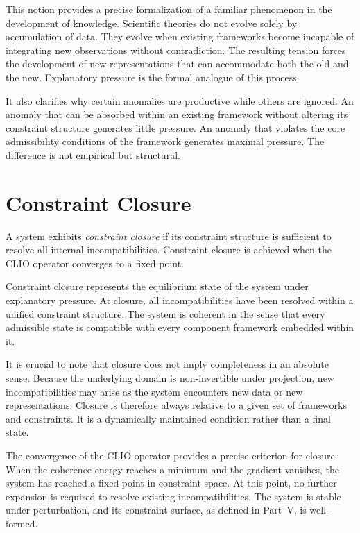 \documentclass[11pt,openany]{book}
\begin{document}
This notion provides a precise formalization of a familiar
phenomenon in the development of knowledge. Scientific
theories do not evolve solely by accumulation of data.
They evolve when existing frameworks become incapable of
integrating new observations without contradiction. The
resulting tension forces the development of new
representations that can accommodate both the old and the
new. Explanatory pressure is the formal analogue of this
process.

It also clarifies why certain anomalies are productive
while others are ignored. An anomaly that can be absorbed
within an existing framework without altering its
constraint structure generates little pressure. An anomaly
that violates the core admissibility conditions of the
framework generates maximal pressure. The difference is not
empirical but structural.

\section{Constraint Closure}
\label{sec:closure}

\begin{definition}
\label{def:closure}
A system exhibits \emph{constraint closure} if its
constraint structure is sufficient to resolve all internal
incompatibilities. Constraint closure is achieved when the
CLIO operator converges to a fixed point.
\end{definition}

Constraint closure represents the equilibrium state of the
system under explanatory pressure. At closure, all
incompatibilities have been resolved within a unified
constraint structure. The system is coherent in the sense
that every admissible state is compatible with every
component framework embedded within it.

It is crucial to note that closure does not imply
completeness in an absolute sense. Because the underlying
domain is non-invertible under projection, new
incompatibilities may arise as the system encounters new
data or new representations. Closure is therefore always
relative to a given set of frameworks and constraints. It
is a dynamically maintained condition rather than a final
state.

The convergence of the CLIO operator provides a precise
criterion for closure. When the coherence energy reaches a
minimum and the gradient vanishes, the system has reached a
fixed point in constraint space. At this point, no further
expansion is required to resolve existing incompatibilities.
The system is stable under perturbation, and its constraint
surface, as defined in Part~V, is well-formed.
\end{document}
